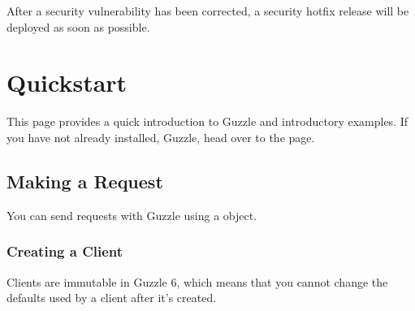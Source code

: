 \documentclass[a4paper,11pt,spanish]{sphinxmanual}
\begin{document}
After a security vulnerability has been corrected, a security hotfix release will
be deployed as soon as possible.


\part{Quickstart}
\label{\detokenize{quickstart::doc}}\label{\detokenize{quickstart:quickstart}}
This page provides a quick introduction to Guzzle and introductory examples.
If you have not already installed, Guzzle, head over to the {\hyperref[\detokenize{overview:installation}]{}}
page.


\chapter{Making a Request}
\label{\detokenize{quickstart:making-a-request}}
You can send requests with Guzzle using a 
object.


\section{Creating a Client}
\label{\detokenize{quickstart:creating-a-client}}
\begin{sphinxVerbatim}[commandchars=\\\{\}]
 

   \PYG{p}{([}
      
       
\PYG{p}{]);}
\end{sphinxVerbatim}

Clients are immutable in Guzzle 6, which means that you cannot change the defaults used by a client after it's created.
\end{document}
